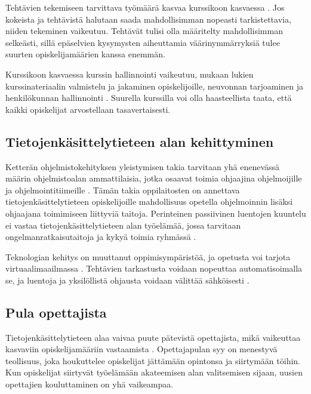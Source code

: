 \documentclass[finnish]{tktltiki2}
\theoremstyle{definition}
\theoremstyle{remark}
\begin{document}
Tehtävien tekemiseen tarvittava työmäärä kasvaa kurssikoon kasvaessa \cite{Kay98}. Jos kokeista ja tehtävistä halutaan saada mahdollisimman nopeasti tarkistettavia, niiden tekeminen vaikeutuu. Tehtävät tulisi olla määritelty mahdollisimman selkeästi, sillä epäselvien kysymysten aiheuttamia väärinymmärryksiä tulee suurten opiskelijamäärien kanssa enemmän.  \par

Kurssikoon kasvaessa kurssin hallinnointi vaikeutuu, mukaan lukien kurssinateriaalin valmistelu ja jakaminen opiskelijoille, neuvonnan tarjoaminen ja henkilökunnan hallinnointi \cite{Chamillard02}. Suurella kurssilla voi olla haasteellista taata, että kaikki opiskelijat arvostellaan tasavertaisesti. \par



\subsection{Tietojenkäsittelytieteen alan kehittyminen}

Ketterän ohjelmistokehityksen yleistymisen takia tarvitaan yhä enenevässä määrin ohjelmistoalan ammattilaisia, jotka osaavat toimia ohjaajina ohjelmoijille ja ohjelmointitiimeille \cite{Vikberg}. Tämän takia oppilaitosten on annettava tietojenkäsittelytieteen opiskelijoille mahdollisuus opetella ohjelmoinnin lisäksi ohjaajana toimimiseen liittyviä taitoja. Perinteinen passiivinen luentojen kuuntelu ei vastaa tietojenkäsittelytieteen alan työelämää, jossa tarvitaan ongelmanratkaisutaitoja ja kykyä toimia ryhmässä \cite{Vihavainen}. \par

Teknologian kehitys on muuttanut oppimisympäristöä, ja opetusta voi tarjota virtuaalimaailmassa \cite{Yadin11}. Tehtävien tarkastusta voidaan nopeuttaa automatisoimalla se, ja luentoja ja yksilöllistä ohjausta voidaan välittää sähköisesti \cite{Jimenez-Periz00}. \par



\subsection{Pula opettajista}
Tietojenkäsittelytieteen alaa vaivaa puute pätevistä opettajista, mikä vaikeuttaa kasvaviin opiskelijamääriin vastaamista \cite{Roberts99}. Opettajapulan syy on menestyvä teollisuus, joka houkuttelee opiskelijat jättämään opintonsa ja siirtymään töihin. Kun opiskelijat siirtyvät työelämään akateemisen alan valitsemisen sijaan, uusien opettajien kouluttaminen on yhä vaikeampaa. \par
\end{document}
